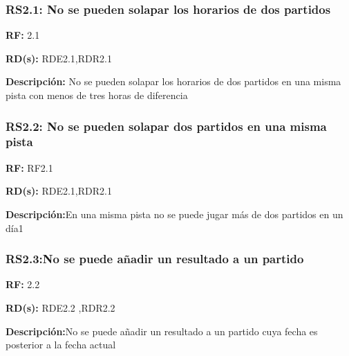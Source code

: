 \subsubsection{RS2.1: No se pueden solapar los horarios de dos partidos}
\textbf{RF:} 2.1

\textbf{RD(s):} RDE2.1,RDR2.1

\textbf{Descripción:} No se pueden solapar los horarios de dos partidos en una misma pista con menos de tres horas de diferencia

\subsubsection{RS2.2: No se pueden solapar dos partidos en una misma pista}
\textbf{RF:} RF2.1

\textbf{RD(s):} RDE2.1,RDR2.1

\textbf{Descripción:}En una misma pista no se puede jugar más de dos partidos en un día1



\subsubsection{RS2.3:No se puede añadir un resultado a un partido}
\textbf{RF:} 2.2

\textbf{RD(s):} RDE2.2 ,RDR2.2

\textbf{Descripción:}No se puede añadir un resultado a un partido cuya fecha es posterior a la fecha actual
\pagebreak
